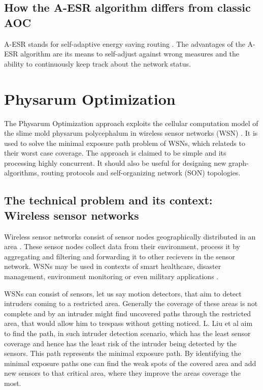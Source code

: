 \documentclass[cameraready]{IWORK2014}
\begin{document}
\subsection{How the A-ESR algorithm differs from classic AOC}

A-ESR stands for self-adaptive energy saving routing \cite{kim2012ant}. The advantages of the A-ESR algorithm are its means to self-adjust against wrong measures and the ability to continuously keep track about the network status.

\section{Physarum Optimization}
The Physarum Optimization approach exploits the cellular computation model of the slime mold physarum polycephalum in wireless sensor networks (WSN) \cite{liu2012physarum}. It is used to solve the minimal exposure path problem of WSNs, which relateds to their worst case coverage. The approach is claimed to be simple and its processing highly concurrent. It should also be useful for designing new graph-algorithms, routing protocols and self-organizing network (SON) topologies.

\subsection{The technical problem and its context: Wireless sensor networks}
Wireless sensor networks consist of sensor nodes geographically distributed in an area \cite{nazi2013robust}. These sensor nodes collect data from their environment, process it by aggregating and filtering and forwarding it to other recievers in the sensor network. WSNs may be used in contexts of smart healthcare, disaster management, environment monitoring \cite{nazi2013robust} or even military applications \cite{liu2012physarum}.

WSNs can consist of sensors, let us say motion detectors, that aim to detect intruders coming to a restricted area. Generally the coverage of these areas is not complete and by an intruder might find uncovered paths through the restricted area, that would allow him to trespass without getting noticed. L. Liu et al \cite{liu2012physarum} aim to find the path, in such intruder detection scenario, which has the least sensor coverage and hence has the least risk of the intruder being detected by the sensors. This path represents the minimal exposure path. By identifying the minimal exposure paths one can find the weak spots of the covered area and add new sensors to that critical area, where they improve the areas coverage the most.
\end{document}
